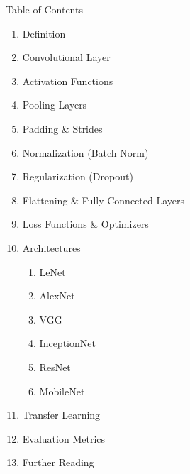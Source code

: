 \begin{frame}[allowframebreaks]{Table of Contents}
\begin{enumerate}
    \item Definition
    \item Convolutional Layer
    \item Activation Functions
    \item Pooling Layers
    \item Padding \& Strides
    \item Normalization (Batch Norm)
    \item Regularization (Dropout)
    \item Flattening \& Fully Connected Layers
    \item Loss Functions \& Optimizers
    \item Architectures
        \begin{enumerate}
            \item LeNet
            \item AlexNet
            \item VGG
            \item InceptionNet
            \item ResNet
            \item MobileNet
        \end{enumerate}
    \item Transfer Learning
    \item Evaluation Metrics
    \item Further Reading
\end{enumerate}
\end{frame}